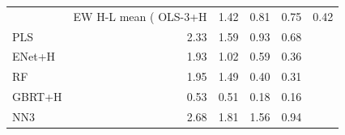 \begin{tabular}{lrrrr}
\toprule
 & EW H-L mean (%
\midrule
OLS-3+H & 1.42 & 0.81 & 0.75 & 0.42 \\
PLS & 2.33 & 1.59 & 0.93 & 0.68 \\
ENet+H & 1.93 & 1.02 & 0.59 & 0.36 \\
RF & 1.95 & 1.49 & 0.40 & 0.31 \\
GBRT+H & 0.53 & 0.51 & 0.18 & 0.16 \\
NN3 & 2.68 & 1.81 & 1.56 & 0.94 \\
\bottomrule
\end{tabular}

